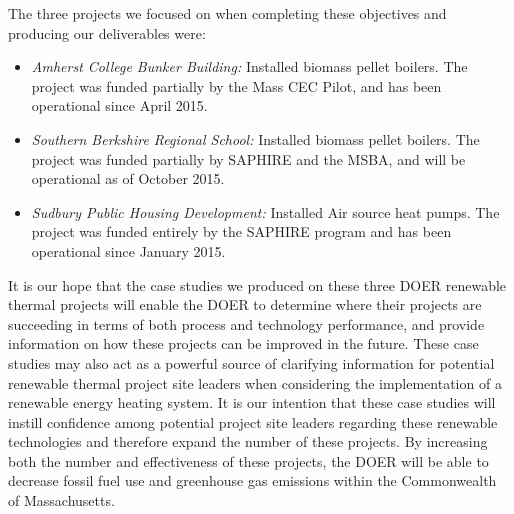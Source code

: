 \noindent
The three projects we focused on when completing these objectives and producing our deliverables were:
\begin{itemize}
  \item{\emph{Amherst College Bunker Building:} Installed biomass pellet boilers. The project was funded partially by the Mass CEC Pilot, and has been operational since April 2015.}
  \item{\emph{Southern Berkshire Regional School:} Installed biomass pellet boilers. The project was funded partially by SAPHIRE and the MSBA, and will be operational as of October 2015.}
  \item{\emph{Sudbury Public Housing Development:} Installed Air source heat pumps. The project was funded entirely by the SAPHIRE program and has been operational since January 2015.}
\end{itemize}
\par It is our hope that the case studies we produced on these three DOER renewable thermal projects will enable the DOER to determine where their projects are succeeding in terms of both process and technology performance, and provide information on how these projects can be improved in the future. These case studies may also act as a powerful source of clarifying information for potential renewable thermal project site leaders when considering the implementation of a renewable energy heating system. It is our intention that these case studies will instill confidence among potential project site leaders regarding these renewable technologies and therefore expand the number of these projects. By increasing both the number and effectiveness of these projects, the DOER will be able to decrease fossil fuel use and greenhouse gas emissions within the Commonwealth of Massachusetts.
